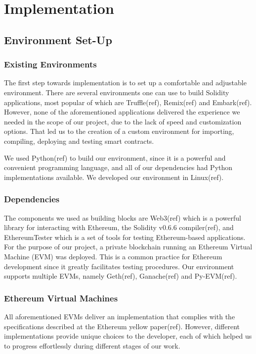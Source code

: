 \section{Implementation}

\subsection{Environment Set-Up}

\subsubsection{Existing Environments}

The first step towards implementation is to set up a comfortable and adjustable
environment. There are several environments one can use to build Solidity
applications, most popular of which are Truffle(ref), Remix(ref) and
Embark(ref). However, none of the aforementioned applications delivered the
experience we needed in the scope of our project, due to the lack of speed and
customization options. That led us to the creation of a custom environment for
importing, compiling, deploying and testing smart contracts.

We used Python(ref) to build our environment, since it is a powerful
and convenient programming language, and all of our dependencies had
Python implementations available. We developed our environment in
Linux(ref).

\subsubsection{Dependencies}

The components we used as building blocks are Web3(ref) which is a
powerful library for interacting with Ethereum, the Solidity v0.6.6
compiler(ref), and EthereumTester which is a set of tools for testing
Ethereum-based applications. For the purpose of our project, a private
blockchain running an Ethereum Virtual Machine (EVM) was deployed.
This is a common practice for Ethereum development since it greatly
facilitates testing procedures. Our environment supports multiple
EVMs, namely Geth(ref), Ganache(ref) and Py-EVM(ref).

\subsubsection{Ethereum Virtual Machines}

All aforementioned EVMs deliver an implementation that complies with
the specifications described at the Ethereum yellow paper(ref).
However, different implementations provide unique choices to the
developer, each of which helped us to progress effortlessly during
different stages of our work.


